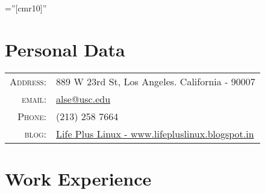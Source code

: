 \documentclass[a4paper,10pt]{article} %
\begin{document}
\pagestyle{empty} %

\font\fb=''[cmr10]'' %


\par{\bigskip\par} %

\section{Personal Data}

\begin{tabular}{rl}
\textsc{Address:} & 889 W 23rd St, Los Angeles. California - 90007 \\
\textsc{email:} & \href{mailto:alse@usc.edu}{alse@usc.edu}\\
\textsc{Phone:} & (213) 258 7664\\
\textsc{blog:} & \href{http://lifepluslinux.blogspot.in}{Life Plus Linux - www.lifepluslinux.blogspot.in}
\end{tabular}


\section{Work Experience}
\end{document}
